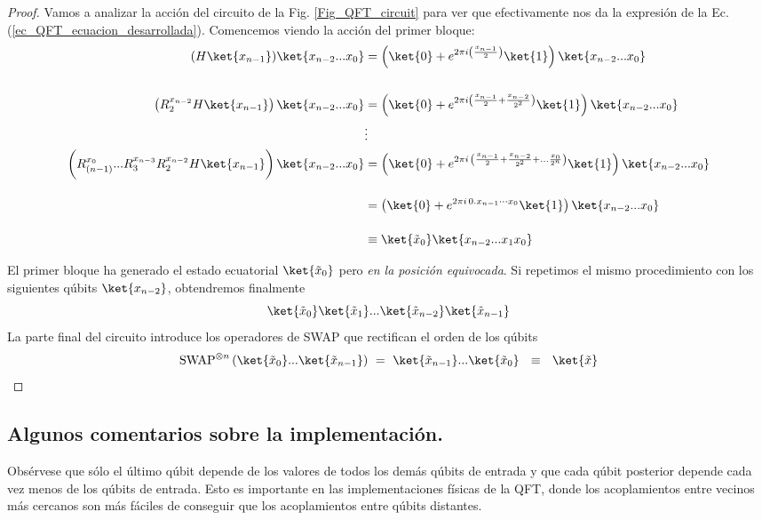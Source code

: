 \documentclass[a4paper,11pt]{book} %
\numberwithin{equation}{chapter}
\begin{document}
\begin{proof}
Vamos a analizar la acción del circuito de la Fig. \ref{Fig_QFT_circuit} para ver que efectivamente nos da la expresión de la Ec. (\ref{ec_QFT_ecuacion_desarrollada}). Comencemos viendo la acción del primer bloque:
	\begin{align*}
	(H\ket{x_{n-1}})\ket{x_{n-2}...x_0} & = \left( \ket{0} + e^{2\pi i \left(\frac{x_{n-1}}{2}\right)} \ket{1}\right) \ket{x_{n-2}...x_0}  \\ \rule{0mm}{10mm}
	\left(\rule{0mm}{3mm} R_{2}^{x_{n-2}}H\ket{x_{n-1}}\right) \ket{x_{n-2}...x_0}  & =  \left( \ket{0} + e^{2\pi i \left(\frac{x_{n-1}}{2} + \frac{x_{n-2}}{2^2}\right)} \ket{1}\right) \ket{x_{n-2}...x_0} \\ 
	& \vdots \\
	\left(\rule{0mm}{5mm}R_{{(n-1)}}^{x_{0}} ... R_{3} ^{x_{n-3}}  R_{2}^{x_{n-2}}H\ket{x_{n-1}}\right) \ket{x_{n-2}...x_0} & =  \left( \ket{0} + e^{2\pi i \, \left(\frac{x_{n-1}}{2} + \frac{x_{n-2}}{2^2}+\ldots \frac{x_0}{2^n}\right)}  \ket{1} \right) \ket{x_{n-2}...x_0} \\ \rule{0mm}{7mm}  
	& =  \left(\ket{0} + e^{2\pi i \, 0.x_{n-1}\cdots x_0}  \ket{1} \right) \ket{x_{n-2}...x_0} \\ \rule{0mm}{7mm}  
	& \equiv \ket{\tilde x_{0}} \ket{x_{n-2}... x_1x_0} 
	\end{align*}

	El primer bloque ha generado el estado ecuatorial $\ket{\tilde x_0}$ pero \textit{en la posición equivocada}. Si repetimos el mismo procedimiento con los siguientes qúbits $\ket{x_{n-2}}$, obtendremos finalmente
$$
 \ket{\tilde x_{0}}\ket{\tilde x_{1}}  ... \ket{\tilde{x}_{n-2}} \ket{\tilde x_{n-1}}
$$
La parte final del circuito introduce los operadores de SWAP que rectifican el orden de los qúbits 
$$
\hbox{SWAP}^{\otimes n} \,  (\ket{\tilde x_{0}}  ...  \ket{\tilde x_{n-1}} ) ~=~ 
\ket{\tilde x_{n-1}} ... \ket{\tilde{x}_{0}} ~~ \equiv ~~ \ket{\tilde x}
$$	
\end{proof}
 
		\subsection{Algunos comentarios sobre la implementación.}

Obsérvese que sólo el último qúbit depende de los valores de todos los demás qúbits de entrada y que cada qúbit posterior depende cada vez menos de los qúbits de entrada. Esto es importante en las implementaciones físicas de la QFT, donde los acoplamientos entre vecinos más cercanos son más fáciles de conseguir que los acoplamientos entre qúbits distantes.
\end{document}
